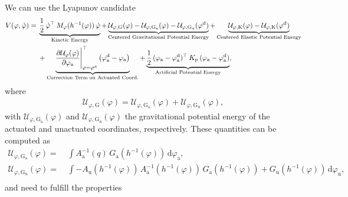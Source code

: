 We can use the Lyapunov candidate
\begin{equation}
\begin{split}\small
    V(\varphi, \dot{\varphi}) =& \: \underbrace{\frac{1}{2} \, \dot{\varphi}^\top \, M_\varphi(h^{-1}(\varphi)) \, \dot{\varphi}}_\text{Kinetic Energy} + \underbrace{\mathcal{U}_{\varphi,\mathrm{G}}(\varphi) - \mathcal{U}_{\varphi,\mathrm{G}_\mathrm{a}}(\varphi) - \mathcal{U}_{\varphi,\mathrm{G}_\mathrm{u}}(\varphi^\mathrm{d})}_\text{Centered Gravitational Potential Energy} + \underbrace{\mathcal{U}_{\varphi,\mathrm{K}}(\varphi) - \mathcal{U}_{\varphi,\mathrm{K}}(\varphi^\mathrm{d})}_\text{Centered Elastic Potential Energy}\\
    & \: + \underbrace{\frac{\partial \mathcal{U}_\varphi(\varphi)}{\partial \varphi_\mathrm{a}} \Bigg |_{\varphi = \varphi^\mathrm{d}}^\top \left ( \varphi_\mathrm{a}^\mathrm{d} - \varphi_\mathrm{a} \right )}_\text{Correction Term on Actuated Coord.} + \underbrace{\frac{1}{2} \, (\varphi_\mathrm{a}-\varphi_\mathrm{a}^\mathrm{d})^\top \, K_\mathrm{p} \, (\varphi_\mathrm{a}-\varphi_\mathrm{a}^\mathrm{d})}_\text{Artificial Potential Energy},
\end{split}
\end{equation}
where
\begin{equation}
\begin{split}
    \mathcal{U}_{\varphi,\mathrm{G}}(\varphi) = \mathcal{U}_{\varphi,\mathrm{G}_\mathrm{a}}(\varphi) + \mathcal{U}_{\varphi,\mathrm{G}_\mathrm{u}}(\varphi),
\end{split}
\end{equation}
with $\mathcal{U}_{\varphi,\mathrm{G}_\mathrm{a}}(\varphi)$ and $\mathcal{U}_{\varphi,\mathrm{G}_\mathrm{u}}(\varphi)$ the gravitational potential energy of the actuated and unactuated coordinates, respectively.
These quantities can be computed as
\begin{equation}
\begin{split}
    \mathcal{U}_{\varphi,\mathrm{G}_\mathrm{a}}(\varphi) =& \: \int A_\mathrm{a}^{-1}(q) \, G_\mathrm{a}(h^{-1}(\varphi)) \, \mathrm{d}\varphi_\mathrm{a},\\
    \mathcal{U}_{\varphi,\mathrm{G}_\mathrm{u}}(\varphi) =& \: \int -A_\mathrm{u}(h^{-1}(\varphi)) \, A_\mathrm{a}^{-1}(h^{-1}(\varphi)) \, G_\mathrm{a}(h^{-1}(\varphi)) + G_\mathrm{u}(h^{-1}(\varphi)) \, \mathrm{d}\varphi_\mathrm{u},\\
\end{split}
\end{equation}
and need to fulfill the properties
